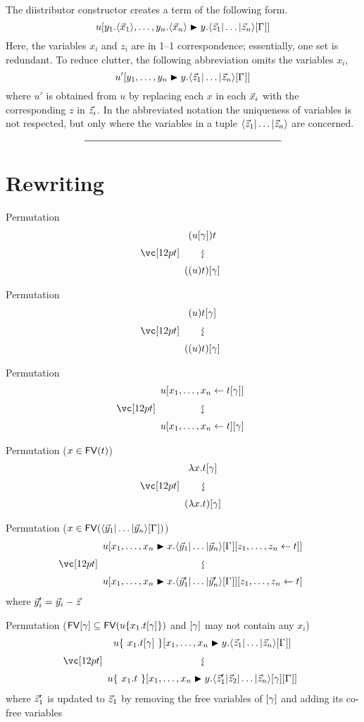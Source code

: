 \documentclass{amsart}
\begin{document}


The diistributor constructor creates a term of the following form.
\[
	u\diistr*{y_1.\tup*{\vv*x_1},\ldots,y_n.\tup*{\vv*x_n}}y{\ttup*z\G}
\]
Here, the variables $x_i$ and $z_i$ are in 1--1 correspondence; essentially, one set is redundant.
%
To reduce clutter, the following abbreviation omits the variables $x_i$,
\[
	u'\diistr yy{\ttup*z\G}
\]
where $u'$ is obtained from $u$ by replacing each $x$ in each $\vv*x_i$ with the corresponding $z$ in $\vv*z_i$.
%
In the abbreviated notation the uniqueness of variables is not respected, but only where the variables in a tuple $\ttup*z$ are concerned.


\[
	\rule{200pt}{.5pt}
\]


\section*{Rewriting}

\noindent
Permutation
\[
\displayrewrite
{ (u\g)t }
{ ((u)t)\g }
\]

\bigskip
\bigskip
\bigskip

\noindent
Permutation
\[
\displayrewrite
{ (u)t\g }
{ ((u)t)\g }
\]

\bigskip
\bigskip
\bigskip

\noindent
Permutation
\[
\displayrewrite
{ u\share x{t\g} }
{ u\share xt\g }
\]

\bigskip
\bigskip
\bigskip

\noindent
Permutation ($x\in{\mathop{\mathsf{FV}}}(t)$)
\[
\displayrewrite
{ \lambda x. t\g }
{ (\lambda x. t) \g }
\]

\bigskip
\bigskip
\bigskip

\noindent
Permutation ($x\in\FV(\ttup*y\G)$)
\[
\displayrewrite
  { u\diistr xx{\ttup*y\G\share zt} }
  { u\diistr xx{\ttup{\vv*y'}\G}\share zt }
\]
where $\vv*y'_i=\vv*y_i-\vv*z$

\bigskip
\bigskip
\bigskip

\noindent
Permutation ($\FV\g\subseteq\FV(u\cxt*{x_1.t\g})$ and $\g$ may not contain any
$x_i$)
\[
\displayrewrite
  { u\cxt*{~x_1.t\g~}\diistr xy{\ttup*z\G} }
  { u\cxt*{~x_1.t~}\diistr xy{\tup*{\vv*z'_1|\vv*z_2|\dotso|\vv*z_n}\g\G} }
\]
where $\vv*z'_1$ is updated to $\vv*z_1$ by removing the free variables of $\g$ and adding its co-free variables
\end{document}
